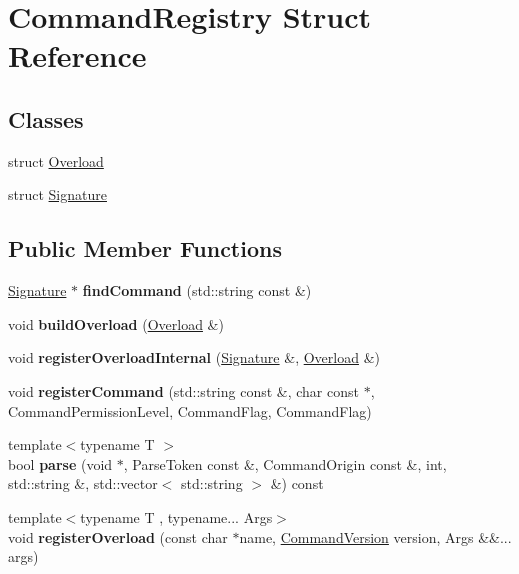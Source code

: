 \hypertarget{struct_command_registry}{}\section{Command\+Registry Struct Reference}
\label{struct_command_registry}
\subsection*{Classes}
\begin{DoxyCompactItemize}
\item 
struct \mbox{\hyperlink{struct_command_registry_1_1_overload}{Overload}}
\item 
struct \mbox{\hyperlink{struct_command_registry_1_1_signature}{Signature}}
\end{DoxyCompactItemize}
\subsection*{Public Member Functions}
\begin{DoxyCompactItemize}
\item 
\mbox{\label{struct_command_registry_ab86cdc6dc88a71431ff15af68cb9dd01}} 
\mbox{\hyperlink{struct_command_registry_1_1_signature}{Signature}} $\ast$ {\bfseries find\+Command} (std\+::string const \&)
\item 
\mbox{\label{struct_command_registry_a4f3ca3d86de0806978e859d723d3024e}} 
void {\bfseries build\+Overload} (\mbox{\hyperlink{struct_command_registry_1_1_overload}{Overload}} \&)
\item 
\mbox{\label{struct_command_registry_a85db2ae629dc9a56171632ab34c67afd}} 
void {\bfseries register\+Overload\+Internal} (\mbox{\hyperlink{struct_command_registry_1_1_signature}{Signature}} \&, \mbox{\hyperlink{struct_command_registry_1_1_overload}{Overload}} \&)
\item 
\mbox{\label{struct_command_registry_a4c499da70965b322387794b293da75e5}} 
void {\bfseries register\+Command} (std\+::string const \&, char const $\ast$, Command\+Permission\+Level, Command\+Flag, Command\+Flag)
\item 
\mbox{\label{struct_command_registry_a850ffbccc000ab9930fd5e0a4448912a}} 
{\footnotesize template$<$typename T $>$ }\\bool {\bfseries parse} (void $\ast$, Parse\+Token const \&, Command\+Origin const \&, int, std\+::string \&, std\+::vector$<$ std\+::string $>$ \&) const
\item 
\mbox{\label{struct_command_registry_affc27ae2a19f3ac28cb94efd8ef71cc4}} 
{\footnotesize template$<$typename T , typename... Args$>$ }\\void {\bfseries register\+Overload} (const char $\ast$name, \mbox{\hyperlink{struct_command_version}{Command\+Version}} version, Args \&\&... args)
\end{DoxyCompactItemize}
